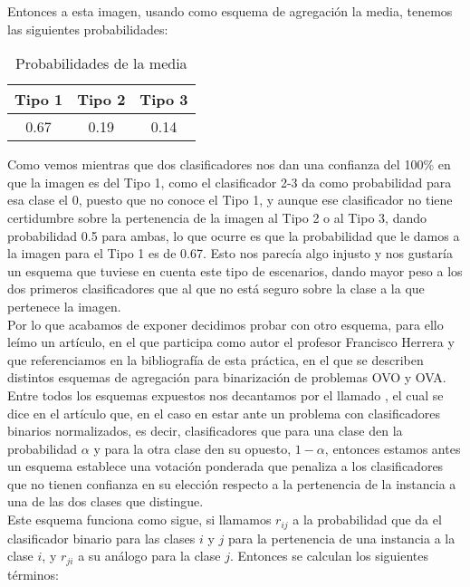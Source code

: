 Entonces a esta imagen, usando como esquema de agregación la media, tenemos las siguientes probabilidades:

\begin{table}[H]
\centering
\caption{Probabilidades de la media}
\label{my-label}
\begin{tabular}{|c|c|c|}
\hline
Tipo 1 & Tipo 2 & Tipo 3 \\ \hline
0.67   & 0.19   & 0.14   \\ \hline
\end{tabular}
\end{table}

Como vemos mientras que dos clasificadores nos dan una confianza del 100\% en que la imagen es del Tipo 1, como el clasificador 2-3 da como probabilidad para esa clase el 0, puesto que no conoce el Tipo 1, y aunque ese clasificador no tiene certidumbre sobre la pertenencia de la imagen al Tipo 2 o al Tipo 3, dando probabilidad 0.5 para ambas, lo que ocurre es que la probabilidad que le damos a la imagen para el Tipo 1 es de 0.67. Esto nos parecía algo injusto y nos gustaría un esquema que tuviese en cuenta este tipo de escenarios, dando mayor peso a los dos primeros clasificadores que al que no está seguro sobre la clase a la que pertenece la imagen.\\

Por lo que acabamos de exponer decidimos probar con otro esquema, para ello leímo un artículo, en el que participa como autor el profesor Francisco Herrera y que referenciamos en la bibliografía de esta práctica, en el que se describen distintos esquemas de agregación para binarización de problemas OVO y OVA. Entre todos los esquemas expuestos nos decantamos por el llamado , el cual se dice en el artículo que, en el caso en estar ante un problema con clasificadores binarios normalizados, es decir, clasificadores que para una clase den la probabilidad $\alpha$ y para la otra clase den su opuesto, $1 - \alpha$, entonces estamos antes un esquema establece una votación ponderada que penaliza a los clasificadores que no tienen confianza en su elección respecto a la pertenencia de la instancia a una de las dos clases que distingue.\\

Este esquema funciona como sigue, si llamamos $r_{ij}$ a la probabilidad que da el clasificador binario para las clases $i$ y $j$ para la pertenencia de una instancia a la clase $i$, y $r_{ji}$ a su análogo para la clase $j$. Entonces se calculan los siguientes términos:

